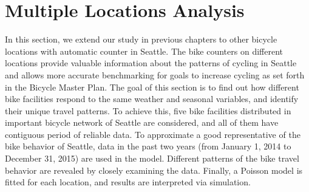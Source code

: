 \documentclass [11pt, proquest] {uwthesis}[2015/03/03]
\begin{document}










\newpage
\thispagestyle{empty}
\mbox{}



\chapter{Multiple Locations Analysis}

In this section, we extend our study in previous chapters to other bicycle locations with automatic counter in Seattle. The bike counters on different locations provide valuable information about the patterns of cycling in Seattle and allows more accurate benchmarking for goals to increase cycling as set forth in the Bicycle Master Plan. The goal of this section is to find out how different bike facilities respond to the same weather and seasonal variables, and identify their unique travel patterns. To achieve this, five bike facilities distributed in important bicycle network of Seattle are considered, and all of them have contiguous period of reliable data. To approximate a good representative of the bike behavior of Seattle, data in the past two years (from January 1, 2014 to December 31, 2015) are used in the model. Different patterns of the bike travel behavior are revealed by closely examining the data. Finally, a Poisson model is fitted for each location, and results are interpreted via simulation.
\end{document}
